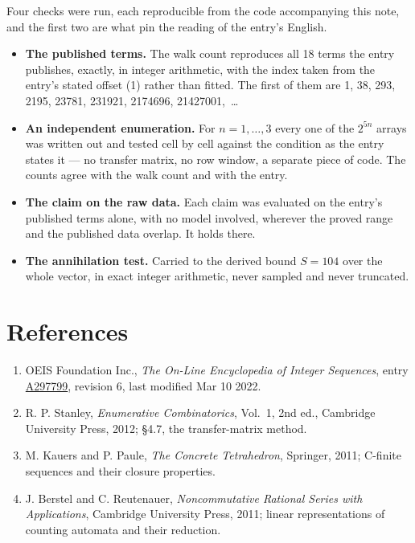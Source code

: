 \documentclass[11pt]{article}
\theoremstyle{definition}
\begin{document}
Four checks were run, each reproducible from the code accompanying this note, and the first two are what pin the reading of the entry's English.

\begin{itemize}

\item {\bfseries The published terms.} The walk count reproduces all 18 terms the entry publishes, exactly, in integer arithmetic, with the index taken from the entry's stated offset (1) rather than fitted. The first of them are 1, 38, 293, 2195, 23781, 231921, 2174696, 21427001,~\dots

\item {\bfseries An independent enumeration.} For $n = 1,\dots,3$ every one of the $2^{5n}$ arrays was written out and tested cell by cell against the condition as the entry states it --- no transfer matrix, no row window, a separate piece of code. The counts agree with the walk count and with the entry.

\item {\bfseries The claim on the raw data.} Each claim was evaluated on the entry's published terms alone, with no model involved, wherever the proved range and the published data overlap. It holds there.

\item {\bfseries The annihilation test.} Carried to the derived bound $S = 104$ over the whole vector, in exact integer arithmetic, never sampled and never truncated.

\end{itemize}

\section{References}

\begin{enumerate}

\item OEIS Foundation Inc., \emph{The On-Line Encyclopedia of Integer Sequences}, entry \href{https://oeis.org/A297799}{A297799}, revision 6, last modified Mar 10 2022.

\item R. P. Stanley, \emph{Enumerative Combinatorics}, Vol.~1, 2nd ed., Cambridge University Press, 2012; \S4.7, the transfer-matrix method.

\item M. Kauers and P. Paule, \emph{The Concrete Tetrahedron}, Springer, 2011; C-finite sequences and their closure properties.

\item J. Berstel and C. Reutenauer, \emph{Noncommutative Rational Series with Applications}, Cambridge University Press, 2011; linear representations of counting automata and their reduction.

\end{enumerate}
\end{document}

